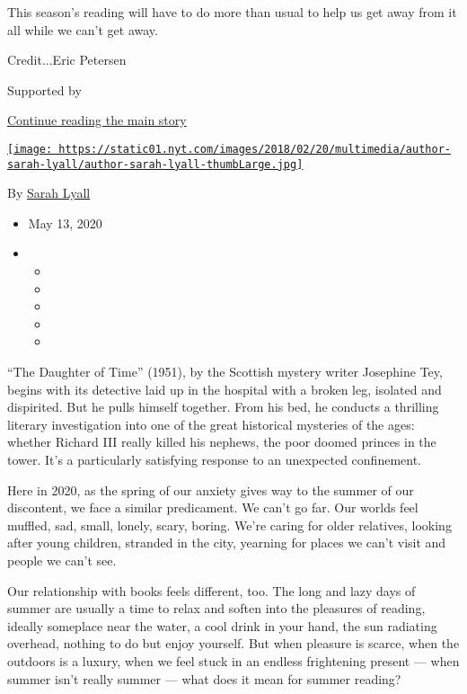 This season's reading will have to do more than usual to help us get
away from it all while we can't get away.

Credit...Eric Petersen

Supported by

\protect\hyperlink{after-sponsor}{Continue reading the main story}

\href{https://www.nytimes.com/by/sarah-lyall}{\texttt{[image: https://static01.nyt.com/images/2018/02/20/multimedia/author-sarah-lyall/author-sarah-lyall-thumbLarge.jpg]}}

By \href{https://www.nytimes.com/by/sarah-lyall}{Sarah Lyall}

\begin{itemize}
\item
  May 13, 2020
\item
  \begin{itemize}
  \item
  \item
  \item
  \item
  \item
  \end{itemize}
\end{itemize}

``The Daughter of Time'' (1951), by the Scottish mystery writer
Josephine Tey, begins with its detective laid up in the hospital with a
broken leg, isolated and dispirited. But he pulls himself together. From
his bed, he conducts a thrilling literary investigation into one of the
great historical mysteries of the ages: whether Richard III really
killed his nephews, the poor doomed princes in the tower. It's a
particularly satisfying response to an unexpected confinement.

Here in 2020, as the spring of our anxiety gives way to the summer of
our discontent, we face a similar predicament. We can't go far. Our
worlds feel muffled, sad, small, lonely, scary, boring. We're caring for
older relatives, looking after young children, stranded in the city,
yearning for places we can't visit and people we can't see.

Our relationship with books feels different, too. The long and lazy days
of summer are usually a time to relax and soften into the pleasures of
reading, ideally someplace near the water, a cool drink in your hand,
the sun radiating overhead, nothing to do but enjoy yourself. But when
pleasure is scarce, when the outdoors is a luxury, when we feel stuck in
an endless frightening present --- when summer isn't really summer ---
what does it mean for summer reading?

